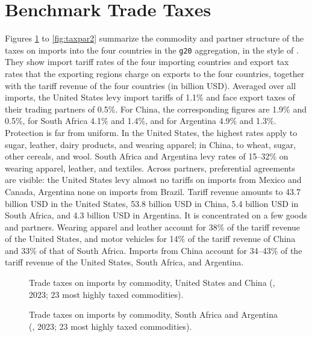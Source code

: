 \section{Benchmark Trade Taxes}\label{app:tariffs}

Figures \ref{fig:taxcom1} to \ref{fig:taxpar2} summarize the commodity and partner structure of the taxes on imports into the four countries in the \texttt{g20} aggregation, in the style of \citet{LanzRutherford2016}.
They show import tariff rates of the four importing countries and export tax rates that the exporting regions charge on exports to the four countries, together with the tariff revenue of the four countries (in billion USD).
Averaged over all imports, the United States levy import tariffs of 1.1\% and face export taxes of their trading partners of 0.5\%.
For China, the corresponding figures are 1.9\% and 0.5\%, for South Africa 4.1\% and 1.4\%, and for Argentina 4.9\% and 1.3\%.
Protection is far from uniform.
In the United States, the highest rates apply to sugar, leather, dairy products, and wearing apparel; in China, to wheat, sugar, other cereals, and wool.
South Africa and Argentina levy rates of 15--32\% on wearing apparel, leather, and textiles.
Across partners, preferential agreements are visible: the United States levy almost no tariffs on imports from Mexico and Canada, Argentina none on imports from Brazil.
Tariff revenue amounts to 43.7 billion USD in the United States, 53.8 billion USD in China, 5.4 billion USD in South Africa, and 4.3 billion USD in Argentina.
It is concentrated on a few goods and partners.
Wearing apparel and leather account for 38\% of the tariff revenue of the United States, and motor vehicles for 14\% of the tariff revenue of China and 33\% of that of South Africa.
Imports from China account for 34--43\% of the tariff revenue of the United States, South Africa, and Argentina.

\begin{figure}[p!]
\centering

\vspace{0.1in}

\caption{Trade taxes on imports by commodity, United States and China (, 2023; 23 most highly taxed commodities).}\label{fig:taxcom1}
\end{figure}

\begin{figure}[p!]
\centering

\vspace{0.1in}

\caption{Trade taxes on imports by commodity, South Africa and Argentina (, 2023; 23 most highly taxed commodities).}\label{fig:taxcom2}
\end{figure}

